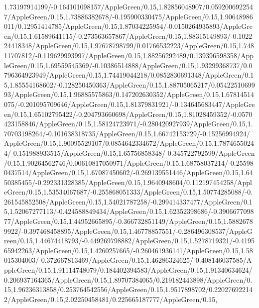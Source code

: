 {\begin{tikzternal}
{1.73197914199/-0.164101098157/AppleGreen/0.15,1.82856048907/0.0592006922547/AppleGreen/0.15,1.73886382678/-0.195900330475/AppleGreen/0.15,1.90648986011/0.12951414785/AppleGreen/0.15,1.87034225954/-0.0150264935893/AppleGreen/0.15,1.61589641115/-0.273563657867/AppleGreen/0.15,1.88315149893/-0.102224418348/AppleGreen/0.15,1.97678798799/0.01766532223/AppleGreen/0.15,1.74811707812/-0.119629993997/AppleGreen/0.15,1.88256292489/0.139396598358/AppleGreen/0.15,1.69559545369/-0.10386514888/AppleGreen/0.15,1.93299368737/0.0796364923949/AppleGreen/0.15,1.74419044218/0.0852830691348/AppleGreen/0.15,1.85554168602/-0.128250450363/AppleGreen/0.15,1.88705065217/0.0542251069993/AppleGreen/0.15,1.96885575863/0.147202630352/AppleGreen/0.15,1.67814514075/-0.201095709646/AppleGreen/0.15,1.81379831921/-0.134645683447/AppleGreen/0.15,1.65102795422/-0.204793660698/AppleGreen/0.15,1.81028459352/-0.0570423158846/AppleGreen/0.15,1.58124723971/-0.280420927939/AppleGreen/0.15,1.70703198264/-0.101638318735/AppleGreen/0.15,1.66742153729/-0.15256994924/AppleGreen/0.15,1.90095529107/0.0854642334672/AppleGreen/0.15,1.78746550244/-0.151988933515/AppleGreen/0.15,1.65756858348/-0.345722792599/AppleGreen/0.15,1.90264562746/0.00610817050971/AppleGreen/0.15,1.68758037214/-0.255980437514/AppleGreen/0.15,1.67087450602/-0.269139551446/AppleGreen/0.15,1.6450385455/-0.292331328385/AppleGreen/0.15,1.9640948604/0.112197454258/AppleGreen/0.15,1.53534067687/-0.255868051333/AppleGreen/0.15,1.50774285088/-0.261545852508/AppleGreen/0.15,1.54021787258/-0.299414337477/AppleGreen/0.15,1.52067277113/-0.424588849434/AppleGreen/0.15,1.62352398686/-0.390667709877/AppleGreen/0.15,1.44952665895/-0.366732851149/AppleGreen/0.15,1.58826789922/-0.397468458895/AppleGreen/0.15,1.46778857551/-0.286496308537/AppleGreen/0.15,1.44674418793/-0.449269798882/AppleGreen/0.15,1.5278719321/-0.419565942263/AppleGreen/0.15,1.4260257665/-0.260461936141/AppleGreen/0.15,1.58015304003/-0.372667813469/AppleGreen/0.15,1.46286324625/-0.408146037585/AppleGreen/0.15,1.91114748079/0.184402394583/AppleGreen/0.15,1.91340634624/0.206937164365/AppleGreen/0.15,1.89707384065/0.219182443898/AppleGreen/0.15,1.96236313858/0.253764542556/AppleGreen/0.15,1.9517898702/0.220276922142/AppleGreen/0.15,2.02250458481/0.225665187777/AppleGreen/0.15,
}
\end{tikzternal}}
